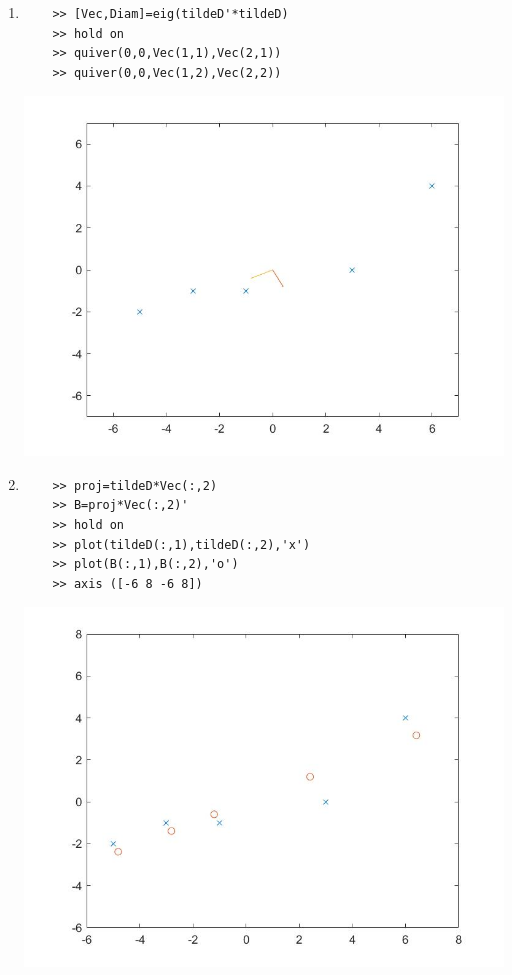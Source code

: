 \begin{sol}
\begin{enumerate}
    \item 
    \begin{verbatim}
    >> [Vec,Diam]=eig(tildeD'*tildeD)
    >> hold on
    >> quiver(0,0,Vec(1,1),Vec(2,1))
    >> quiver(0,0,Vec(1,2),Vec(2,2))
    \end{verbatim}
    \begin{center}
        \includegraphics[scale=.3]{FacesNight7/figs/tildeDeigen.jpg}
    \end{center}
    
    \item
    \begin{verbatim}
    >> proj=tildeD*Vec(:,2)
    >> B=proj*Vec(:,2)'
    >> hold on
    >> plot(tildeD(:,1),tildeD(:,2),'x')
    >> plot(B(:,1),B(:,2),'o')
    >> axis ([-6 8 -6 8])
    \end{verbatim}
    \begin{center}
        \includegraphics[scale=0.3]{FacesNight7/figs/reducedD.jpg}
    \end{center}
\end{enumerate}
\end{sol}

